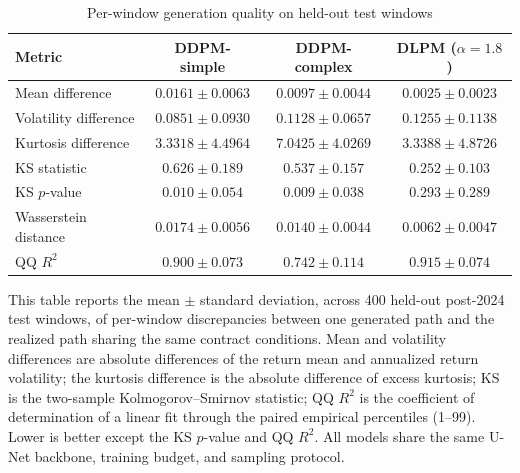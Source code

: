 \documentclass[12pt,letterpaper]{article}
\newcommand{\rSimMean}{$0.0161 \pm 0.0063$}   \newcommand{\rCpxMean}{$0.0097 \pm 0.0044$}   \newcommand{\rDlpmMean}{$0.0025 \pm 0.0023$}
\newcommand{\rSimVol}{$0.0851 \pm 0.0930$}    \newcommand{\rCpxVol}{$0.1128 \pm 0.0657$}    \newcommand{\rDlpmVol}{$0.1255 \pm 0.1138$}
\newcommand{\rSimKurt}{$3.3318 \pm 4.4964$}   \newcommand{\rCpxKurt}{$7.0425 \pm 4.0269$}   \newcommand{\rDlpmKurt}{$3.3388 \pm 4.8726$}
\newcommand{\rSimKS}{$0.626 \pm 0.189$}     \newcommand{\rCpxKS}{$0.537 \pm 0.157$}     \newcommand{\rDlpmKS}{$0.252 \pm 0.103$}
\newcommand{\rSimKSp}{$0.010 \pm 0.054$}    \newcommand{\rCpxKSp}{$0.009 \pm 0.038$}    \newcommand{\rDlpmKSp}{$0.293 \pm 0.289$}
\newcommand{\rSimWD}{$0.0174 \pm 0.0056$}     \newcommand{\rCpxWD}{$0.0140 \pm 0.0044$}     \newcommand{\rDlpmWD}{$0.0062 \pm 0.0047$}
\newcommand{\rSimQQ}{$0.900 \pm 0.073$}     \newcommand{\rCpxQQ}{$0.742 \pm 0.114$}     \newcommand{\rDlpmQQ}{$0.915 \pm 0.074$}
\newcommand{\nTestWindows}{400}
\newcommand{\tabnote}[1]{\begin{minipage}{\linewidth}\vspace{4pt}\footnotesize\singlespacing #1\end{minipage}}
\begin{document}
\begin{table}[ht]
\singlespacing
\centering
\caption{Per-window generation quality on held-out test windows}
\label{tab:persample}
\begin{tabular}{lccc}
\toprule
Metric & DDPM-simple & DDPM-complex & DLPM ($\alpha{=}1.8$) \\
\midrule
Mean difference        & \rSimMean & \rCpxMean & \rDlpmMean \\
Volatility difference  & \rSimVol  & \rCpxVol  & \rDlpmVol  \\
Kurtosis difference    & \rSimKurt & \rCpxKurt & \rDlpmKurt \\
KS statistic           & \rSimKS   & \rCpxKS   & \rDlpmKS   \\
KS $p$-value           & \rSimKSp  & \rCpxKSp  & \rDlpmKSp  \\
Wasserstein distance   & \rSimWD   & \rCpxWD   & \rDlpmWD   \\
QQ $R^2$               & \rSimQQ   & \rCpxQQ   & \rDlpmQQ   \\
\bottomrule
\end{tabular}
\tabnote{This table reports the mean $\pm$ standard deviation, across
\nTestWindows{} held-out post-2024 test windows, of per-window discrepancies
between one generated path and the realized path sharing the same contract
conditions. Mean and volatility differences are absolute differences of the
return mean and annualized return volatility; the kurtosis difference is the
absolute difference of excess kurtosis; KS is the two-sample
Kolmogorov--Smirnov statistic; QQ $R^2$ is the coefficient of determination
of a linear fit through the paired empirical percentiles (1--99). Lower is
better except the KS $p$-value and QQ $R^2$. All models share the same U-Net
backbone, training budget, and sampling protocol.}
\end{table}
\end{document}
